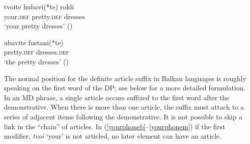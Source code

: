 \documentclass[output=paper]{langscibook}
\begin{document}

\ea \label{dresses3}
\ea \label{dresses3b}
\gll tvoite 	hubavi(*te) 	rokli\\
 	your.\textsc{def}	pretty.\textsc{def}	dresses \\
\glt ‘your pretty dresses’ \hfill()

\ex \label{dresses3m}
\gll ubavite	fustani(*te) \\
pretty.\textsc{def} 	dresses.\textsc{def} \\
\glt ‘the pretty dresses’ \hfill()
\z
\z

\noindent The normal position for the definite article suffix in Balkan  languages is roughly speaking on the first word of the DP; see below for a more detailed formulation. In an MD phrase, a single article occurs suffixed to the first word after the demonstrative. When there is more than one article, the suffix must attach to a series of adjacent items following the demonstrative. It is not possible to skip a link in the ``chain'' of articles. In (\ref{yourphoneb}--\ref{yourphonem}) if the first modifier, \textit{tvoi} `your' is not articled, no later element can have an article.


\ea \label{yourphoneb}
\z
\z

\end{document}
